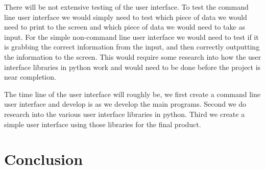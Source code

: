 ﻿\documentclass[onecolumn, draftclsnofoot,10pt, compsoc]{IEEEtran}
\begin{document}
There will be not extensive testing of the user interface. To test the command line user interface we would simply need to test which piece of data we would need to print to the screen and which piece of data we would need to take as input. For the simple non-command line user interface we would need to test if it is grabbing the correct information from the input, and then correctly outputting the information to the screen. This would require some research into how the user interface libraries in python work and would need to be done before the project is near completion.

The time line of the user interface will roughly be, we first create a command line user interface and develop is as we develop the main programs. Second we do research into the various user interface libraries in python. Third we create a simple user interface using those libraries for the final product.

\section{Conclusion}




\end{document}
